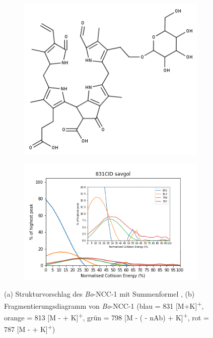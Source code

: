 \documentclass[12pt,a4paper]{article}
\begin{document}
\begin{figure}[!htbp]
  \begin{subfigure}[b]{0.5\textwidth}
    \includegraphics[width=\textwidth]{figures/Kapitel4/Kataboliten/fragmentation_structures/VWA_Katabolit_831.png}
    \caption{}
    \label{fig:831MKLeafspraystructure}
  \end{subfigure}
  \hfill
  \begin{subfigure}[b]{0.7\textwidth}
    \includegraphics[width=\textwidth]{figures/Kapitel4/Kataboliten/diags/831CID-savgol.png}
    \caption{}
    \label{fig:831MKLeafspraydiags}
  \end{subfigure}
  \caption[Strukturvorschlag des \textit{Bo}-NCC-1 und Fragmentierungsdiagramm, Quelle: Autor]{(a) Strukturvorschlag des \textit{Bo}-NCC-1 mit Summenformel , (b) Fragmentierungsdiagramm von \textit{Bo}-NCC-1 (blau = 831 [M+K]\textsuperscript{+}, orange = 813 [M -  + K]\textsuperscript{+}, grün = 798 [M - ( - \gls{nAb}) + K]\textsuperscript{+}, rot = 787 [M -  + K]\textsuperscript{+})}
\end{figure}
\end{document}
